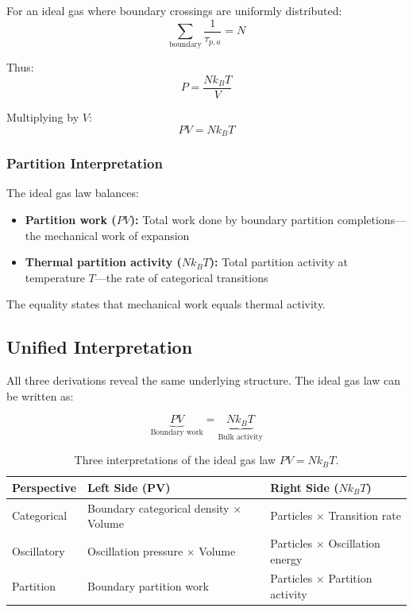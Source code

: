 For an ideal gas where boundary crossings are uniformly distributed:
\begin{equation}
\sum_{\text{boundary}} \frac{1}{\tau_{p,a}} = N
\end{equation}

Thus:
\begin{equation}
P = \frac{Nk_B T}{V}
\end{equation}

Multiplying by $V$:
\begin{equation}
PV = Nk_B T
\end{equation}

\subsubsection{Partition Interpretation}

The ideal gas law balances:
\begin{itemize}
\item \textbf{Partition work ($PV$):} Total work done by boundary partition completions---the mechanical work of expansion
\item \textbf{Thermal partition activity ($Nk_B T$):} Total partition activity at temperature $T$---the rate of categorical transitions
\end{itemize}

The equality states that mechanical work equals thermal activity.

\subsection{Unified Interpretation}

All three derivations reveal the same underlying structure. The ideal gas law can be written as:

\begin{equation}
\underbrace{PV}_{\text{Boundary work}} = \underbrace{Nk_B T}_{\text{Bulk activity}}
\end{equation}

\begin{table}[h]
\centering
\begin{tabular}{p{3cm}p{5cm}p{5cm}}
\hline
\textbf{Perspective} & \textbf{Left Side (PV)} & \textbf{Right Side ($Nk_B T$)} \\
\hline
Categorical & Boundary categorical density $\times$ Volume & Particles $\times$ Transition rate \\[0.3cm]
Oscillatory & Oscillation pressure $\times$ Volume & Particles $\times$ Oscillation energy \\[0.3cm]
Partition & Boundary partition work & Particles $\times$ Partition activity \\
\hline
\end{tabular}
\caption{Three interpretations of the ideal gas law $PV = Nk_B T$.}
\label{tab:ideal_gas_interpretations}
\end{table}

